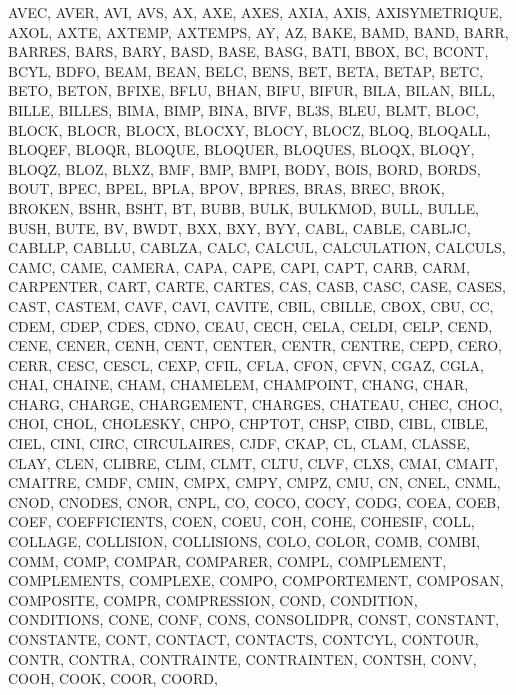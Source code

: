 {{{		AVEC,
		AVER,
		AVI,
		AVS,
		AX,
		AXE,
		AXES,
		AXIA,
		AXIS,
		AXISYMETRIQUE,
		AXOL,
		AXTE,
		AXTEMP,
		AXTEMPS,
		AY,
		AZ,
		BAKE,
		BAMD,
		BAND,
		BARR,
		BARRES,
		BARS,
		BARY,
		BASD,
		BASE,
		BASG,
		BATI,
		BBOX,
		BC,
		BCONT,
		BCYL,
		BDFO,
		BEAM,
		BEAN,
		BELC,
		BENS,
		BET,
		BETA,
		BETAP,
		BETC,
		BETO,
		BETON,
		BFIXE,
		BFLU,
		BHAN,
		BIFU,
		BIFUR,
		BILA,
		BILAN,
		BILL,
		BILLE,
		BILLES,
		BIMA,
		BIMP,
		BINA,
		BIVF,
		BL3S,
		BLEU,
		BLMT,
		BLOC,
		BLOCK,
		BLOCR,
		BLOCX,
		BLOCXY,
		BLOCY,
		BLOCZ,
		BLOQ,
		BLOQALL,
		BLOQEF,
		BLOQR,
		BLOQUE,
		BLOQUER,
		BLOQUES,
		BLOQX,
		BLOQY,
		BLOQZ,
		BLOZ,
		BLXZ,
		BMF,
		BMP,
		BMPI,
		BODY,
		BOIS,
		BORD,
		BORDS,
		BOUT,
		BPEC,
		BPEL,
		BPLA,
		BPOV,
		BPRES,
		BRAS,
		BREC,
		BROK,
		BROKEN,
		BSHR,
		BSHT,
		BT,
		BUBB,
		BULK,
		BULKMOD,
		BULL,
		BULLE,
		BUSH,
		BUTE,
		BV,
		BWDT,
		BXX,
		BXY,
		BYY,
		CABL,
		CABLE,
		CABLJC,
		CABLLP,
		CABLLU,
		CABLZA,
		CALC,
		CALCUL,
		CALCULATION,
		CALCULS,
		CAMC,
		CAME,
		CAMERA,
		CAPA,
		CAPE,
		CAPI,
		CAPT,
		CARB,
		CARM,
		CARPENTER,
		CART,
		CARTE,
		CARTES,
		CAS,
		CASB,
		CASC,
		CASE,
		CASES,
		CAST,
		CASTEM,
		CAVF,
		CAVI,
		CAVITE,
		CBIL,
		CBILLE,
		CBOX,
		CBU,
		CC,
		CDEM,
		CDEP,
		CDES,
		CDNO,
		CEAU,
		CECH,
		CELA,
		CELDI,
		CELP,
		CEND,
		CENE,
		CENER,
		CENH,
		CENT,
		CENTER,
		CENTR,
		CENTRE,
		CEPD,
		CERO,
		CERR,
		CESC,
		CESCL,
		CEXP,
		CFIL,
		CFLA,
		CFON,
		CFVN,
		CGAZ,
		CGLA,
		CHAI,
		CHAINE,
		CHAM,
		CHAMELEM,
		CHAMPOINT,
		CHANG,
		CHAR,
		CHARG,
		CHARGE,
		CHARGEMENT,
		CHARGES,
		CHATEAU,
		CHEC,
		CHOC,
		CHOI,
		CHOL,
		CHOLESKY,
		CHPO,
		CHPTOT,
		CHSP,
		CIBD,
		CIBL,
		CIBLE,
		CIEL,
		CINI,
		CIRC,
		CIRCULAIRES,
		CJDF,
		CKAP,
		CL,
		CLAM,
		CLASSE,
		CLAY,
		CLEN,
		CLIBRE,
		CLIM,
		CLMT,
		CLTU,
		CLVF,
		CLXS,
		CMAI,
		CMAIT,
		CMAITRE,
		CMDF,
		CMIN,
		CMPX,
		CMPY,
		CMPZ,
		CMU,
		CN,
		CNEL,
		CNML,
		CNOD,
		CNODES,
		CNOR,
		CNPL,
		CO,
		COCO,
		COCY,
		CODG,
		COEA,
		COEB,
		COEF,
		COEFFICIENTS,
		COEN,
		COEU,
		COH,
		COHE,
		COHESIF,
		COLL,
		COLLAGE,
		COLLISION,
		COLLISIONS,
		COLO,
		COLOR,
		COMB,
		COMBI,
		COMM,
		COMP,
		COMPAR,
		COMPARER,
		COMPL,
		COMPLEMENT,
		COMPLEMENTS,
		COMPLEXE,
		COMPO,
		COMPORTEMENT,
		COMPOSAN,
		COMPOSITE,
		COMPR,
		COMPRESSION,
		COND,
		CONDITION,
		CONDITIONS,
		CONE,
		CONF,
		CONS,
		CONSOLIDPR,
		CONST,
		CONSTANT,
		CONSTANTE,
		CONT,
		CONTACT,
		CONTACTS,
		CONTCYL,
		CONTOUR,
		CONTR,
		CONTRA,
		CONTRAINTE,
		CONTRAINTEN,
		CONTSH,
		CONV,
		COOH,
		COOK,
		COOR,
		COORD,
}}}
